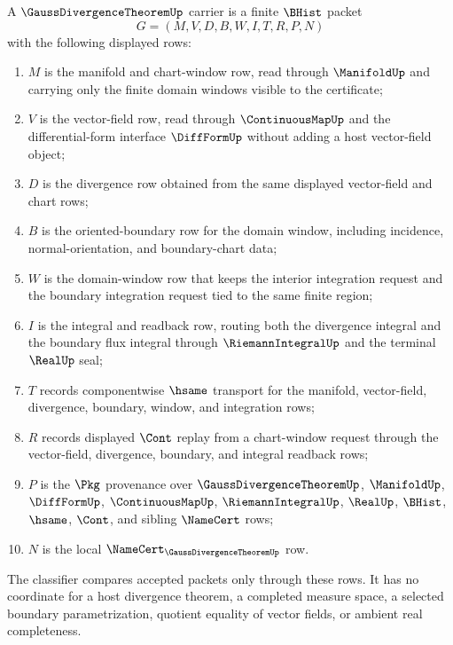 \begin{definition}
\label{def:gauss-divergence-theorem-carrier}
A $\GaussDivergenceTheoremUp$ carrier is a finite $\BHist$ packet
$$
G=(M,V,D,B,W,I,T,R,P,N)
$$
with the following displayed rows:
\begin{enumerate}
\item $M$ is the manifold and chart-window row, read through $\ManifoldUp$ and carrying only the finite domain windows visible to the certificate;
\item $V$ is the vector-field row, read through $\ContinuousMapUp$ and the differential-form interface $\DiffFormUp$ without adding a host vector-field object;
\item $D$ is the divergence row obtained from the same displayed vector-field and chart rows;
\item $B$ is the oriented-boundary row for the domain window, including incidence, normal-orientation, and boundary-chart data;
\item $W$ is the domain-window row that keeps the interior integration request and the boundary integration request tied to the same finite region;
\item $I$ is the integral and readback row, routing both the divergence integral and the boundary flux integral through $\RiemannIntegralUp$ and the terminal $\RealUp$ seal;
\item $T$ records componentwise $\hsame$ transport for the manifold, vector-field, divergence, boundary, window, and integration rows;
\item $R$ records displayed $\Cont$ replay from a chart-window request through the vector-field, divergence, boundary, and integral readback rows;
\item $P$ is the $\Pkg$ provenance over $\GaussDivergenceTheoremUp$, $\ManifoldUp$, $\DiffFormUp$, $\ContinuousMapUp$, $\RiemannIntegralUp$, $\RealUp$, $\BHist$, $\hsame$, $\Cont$, and sibling $\NameCert$ rows;
\item $N$ is the local $\NameCert_{\GaussDivergenceTheoremUp}$ row.
\end{enumerate}
The classifier compares accepted packets only through these rows. It has no coordinate for a host divergence theorem, a completed measure space, a selected boundary parametrization, quotient equality of vector fields, or ambient real completeness.
\end{definition}

